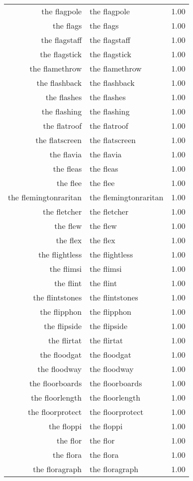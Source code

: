 \begin{table}[ht]
\begin{tabular}{rlr}
  the flagpole & the flagpole & 1.00 \\ 
  the flags & the flags & 1.00 \\ 
  the flagstaff & the flagstaff & 1.00 \\ 
  the flagstick & the flagstick & 1.00 \\ 
  the flamethrow & the flamethrow & 1.00 \\ 
  the flashback & the flashback & 1.00 \\ 
  the flashes & the flashes & 1.00 \\ 
  the flashing & the flashing & 1.00 \\ 
  the flatroof & the flatroof & 1.00 \\ 
  the flatscreen & the flatscreen & 1.00 \\ 
  the flavia & the flavia & 1.00 \\ 
  the fleas & the fleas & 1.00 \\ 
  the flee & the flee & 1.00 \\ 
  the flemingtonraritan & the flemingtonraritan & 1.00 \\ 
  the fletcher & the fletcher & 1.00 \\ 
  the flew & the flew & 1.00 \\ 
  the flex & the flex & 1.00 \\ 
  the flightless & the flightless & 1.00 \\ 
  the flimsi & the flimsi & 1.00 \\ 
  the flint & the flint & 1.00 \\ 
  the flintstones & the flintstones & 1.00 \\ 
  the flipphon & the flipphon & 1.00 \\ 
  the flipside & the flipside & 1.00 \\ 
  the flirtat & the flirtat & 1.00 \\ 
  the floodgat & the floodgat & 1.00 \\ 
  the floodway & the floodway & 1.00 \\ 
  the floorboards & the floorboards & 1.00 \\ 
  the floorlength & the floorlength & 1.00 \\ 
  the floorprotect & the floorprotect & 1.00 \\ 
  the floppi & the floppi & 1.00 \\ 
  the flor & the flor & 1.00 \\ 
  the flora & the flora & 1.00 \\ 
  the floragraph & the floragraph & 1.00 \\ 

\end{tabular}
\end{table}
